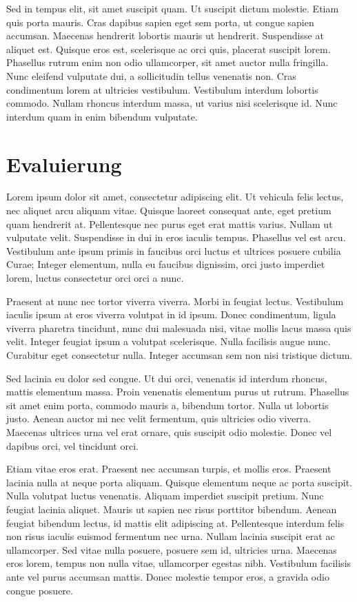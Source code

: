 \documentclass[12pt,oneside,a4paper,parskip]{scrbook}
\begin{document}
Sed in tempus elit, sit amet suscipit quam. Ut suscipit dictum molestie. Etiam quis porta mauris. Cras dapibus sapien eget sem porta, ut congue sapien accumsan. Maecenas hendrerit lobortis mauris ut hendrerit. Suspendisse at aliquet est. Quisque eros est, scelerisque ac orci quis, placerat suscipit lorem. Phasellus rutrum enim non odio ullamcorper, sit amet auctor nulla fringilla. Nunc eleifend vulputate dui, a sollicitudin tellus venenatis non. Cras condimentum lorem at ultricies vestibulum. Vestibulum interdum lobortis commodo. Nullam rhoncus interdum massa, ut varius nisi scelerisque id. Nunc interdum quam in enim bibendum vulputate.


\chapter{Evaluierung}

Lorem ipsum dolor sit amet, consectetur adipiscing elit. Ut vehicula felis lectus, nec aliquet arcu aliquam vitae. Quisque laoreet consequat ante, eget pretium quam hendrerit at. Pellentesque nec purus eget erat mattis varius. Nullam ut vulputate velit. Suspendisse in dui in eros iaculis tempus. Phasellus vel est arcu. Vestibulum ante ipsum primis in faucibus orci luctus et ultrices posuere cubilia Curae; Integer elementum, nulla eu faucibus dignissim, orci justo imperdiet lorem, luctus consectetur orci orci a nunc.

Praesent at nunc nec tortor viverra viverra. Morbi in feugiat lectus. Vestibulum iaculis ipsum at eros viverra volutpat in id ipsum. Donec condimentum, ligula viverra pharetra tincidunt, nunc dui malesuada nisi, vitae mollis lacus massa quis velit. Integer feugiat ipsum a volutpat scelerisque. Nulla facilisis augue nunc. Curabitur eget consectetur nulla. Integer accumsan sem non nisi tristique dictum.

Sed lacinia eu dolor sed congue. Ut dui orci, venenatis id interdum rhoncus, mattis elementum massa. Proin venenatis elementum purus ut rutrum. Phasellus sit amet enim porta, commodo mauris a, bibendum tortor. Nulla ut lobortis justo. Aenean auctor mi nec velit fermentum, quis ultricies odio viverra. Maecenas ultrices urna vel erat ornare, quis suscipit odio molestie. Donec vel dapibus orci, vel tincidunt orci.

Etiam vitae eros erat. Praesent nec accumsan turpis, et mollis eros. Praesent lacinia nulla at neque porta aliquam. Quisque elementum neque ac porta suscipit. Nulla volutpat luctus venenatis. Aliquam imperdiet suscipit pretium. Nunc feugiat lacinia aliquet. Mauris ut sapien nec risus porttitor bibendum. Aenean feugiat bibendum lectus, id mattis elit adipiscing at. Pellentesque interdum felis non risus iaculis euismod fermentum nec urna. Nullam lacinia suscipit erat ac ullamcorper. Sed vitae nulla posuere, posuere sem id, ultricies urna. Maecenas eros lorem, tempus non nulla vitae, ullamcorper egestas nibh. Vestibulum facilisis ante vel purus accumsan mattis. Donec molestie tempor eros, a gravida odio congue posuere.
\end{document}
